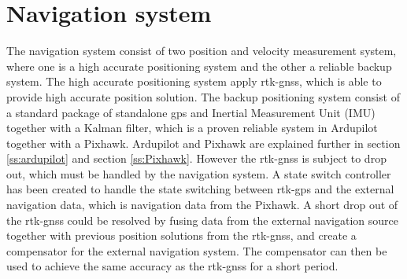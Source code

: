 \section{Navigation system}
The navigation system consist of two position and velocity measurement system, where one is a high accurate positioning system and the other a reliable backup system. The high accurate positioning system apply \gls{rtk-gnss}, which is able to provide high accurate position solution. The backup positioning system consist of a standard package of standalone \gls{gps} and Inertial Measurement Unit (IMU) together with a Kalman filter, which is a proven reliable system in Ardupilot together with a Pixhawk. Ardupilot and Pixhawk are explained further in section \ref{ss:ardupilot} and section \ref{ss:Pixhawk}. However the \gls{rtk-gnss} is subject to drop out, which must be handled by the navigation system. A state switch controller has been created to handle the state switching between \gls{rtk-gps} and the external navigation data, which is navigation data from the Pixhawk. A short drop out of the \gls{rtk-gnss} could be resolved by fusing data from the external navigation source together with previous position solutions from the \gls{rtk-gnss}, and create a compensator for the external navigation system. The compensator can then be used to achieve the same accuracy as the \gls{rtk-gnss} for a short period.
